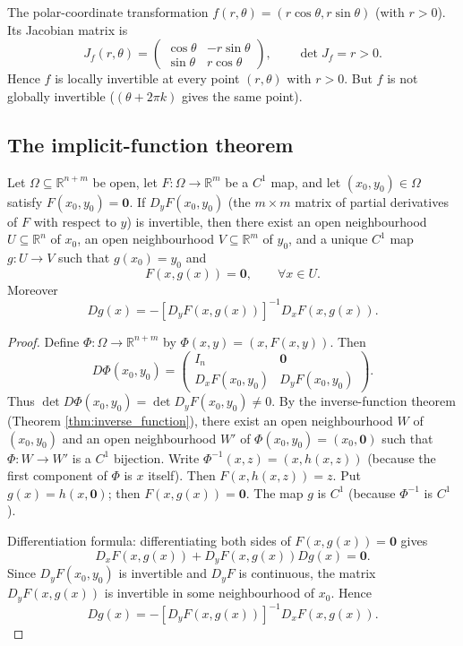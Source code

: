 \begin{example}\label{ex:polar_coordinates}
The polar-coordinate transformation $f(r, \theta) = (r \cos\theta, r \sin\theta)$ (with $r > 0$). Its Jacobian matrix is
\[
J_f(r, \theta) = \begin{pmatrix} \cos\theta & -r \sin\theta \\ \sin\theta & r \cos\theta \end{pmatrix}, \qquad \det J_f = r > 0.
\]
Hence $f$ is locally invertible at every point $(r, \theta)$ with $r > 0$. But $f$ is not globally invertible ($(\theta + 2\pi k)$ gives the same point).
\end{example}

\subsection{The implicit-function theorem}

\begin{theorem}\label{thm:implicit_function}
Let $\Omega \subseteq \mathbb{R}^{n+m}$ be open, let $F: \Omega \to \mathbb{R}^m$ be a $C^1$ map, and let $(x_0, y_0) \in \Omega$ satisfy $F(x_0, y_0) = \mathbf{0}$. If $D_y F(x_0, y_0)$ (the $m \times m$ matrix of partial derivatives of $F$ with respect to $y$) is invertible, then there exist an open neighbourhood $U \subseteq \mathbb{R}^n$ of $x_0$, an open neighbourhood $V \subseteq \mathbb{R}^m$ of $y_0$, and a unique $C^1$ map $g: U \to V$ such that $g(x_0) = y_0$ and
\[
F(x, g(x)) = \mathbf{0}, \qquad \forall x \in U.
\]
Moreover
\[
Dg(x) = -[D_y F(x, g(x))]^{-1} D_x F(x, g(x)).
\]
\end{theorem}

\begin{proof}
Define $\Phi: \Omega \to \mathbb{R}^{n+m}$ by $\Phi(x, y) = (x, F(x, y))$. Then
\[
D\Phi(x_0, y_0) = \begin{pmatrix} I_n & \mathbf{0} \\ D_x F(x_0, y_0) & D_y F(x_0, y_0) \end{pmatrix}.
\]
Thus $\det D\Phi(x_0, y_0) = \det D_y F(x_0, y_0) \neq 0$. By the inverse-function theorem (Theorem \ref{thm:inverse_function}), there exist an open neighbourhood $W$ of $(x_0, y_0)$ and an open neighbourhood $W'$ of $\Phi(x_0, y_0) = (x_0, \mathbf{0})$ such that $\Phi: W \to W'$ is a $C^1$ bijection. Write $\Phi^{-1}(x, z) = (x, h(x, z))$ (because the first component of $\Phi$ is $x$ itself). Then $F(x, h(x, z)) = z$. Put $g(x) = h(x, \mathbf{0})$; then $F(x, g(x)) = \mathbf{0}$. The map $g$ is $C^1$ (because $\Phi^{-1}$ is $C^1$).

Differentiation formula: differentiating both sides of $F(x, g(x)) = \mathbf{0}$ gives
\[
D_x F(x, g(x)) + D_y F(x, g(x)) Dg(x) = \mathbf{0}.
\]
Since $D_y F(x_0, y_0)$ is invertible and $D_y F$ is continuous, the matrix $D_y F(x, g(x))$ is invertible in some neighbourhood of $x_0$. Hence
\[
Dg(x) = -[D_y F(x, g(x))]^{-1} D_x F(x, g(x)).
\]
\end{proof}

